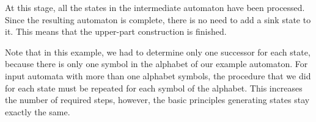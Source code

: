 At this stage, all the states in the intermediate automaton have been processed. Since the resulting automaton is complete, there is no need to add a sink state to it. This means that the upper-part construction is finished.

Note that in this example, we had to determine only one successor for each state, because there is only one symbol in the alphabet of our example automaton. For input automata with more than one alphabet symbols, the procedure that we did for each state must be repeated for each symbol of the alphabet. This increases the number of required steps, however, the basic principles generating states stay exactly the same.









